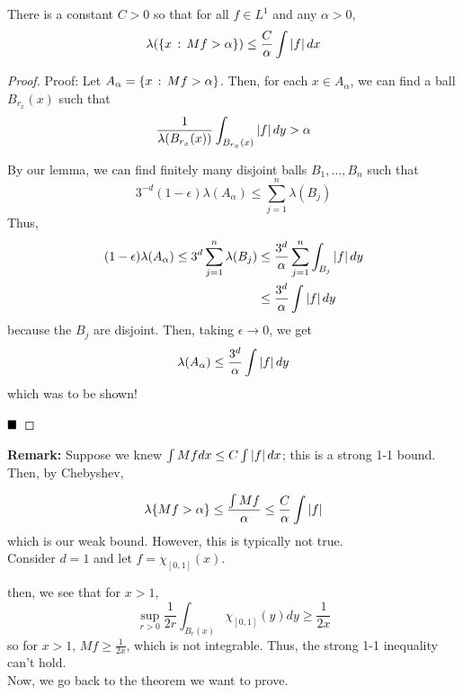 \begin{theorem}
    There is a constant $C > 0$ so that for all $f \in L^1$ and any $\alpha > 0$,
    \[ \lambda(\{x \, :\, Mf > \alpha\}) \leq \frac{C}{\alpha}\int \left\lvert {f} \right\rvert dx \]
\end{theorem}
\begin{proof}{Proof:}
    Let $A_{\alpha} = \{x \, :\, Mf > \alpha\}$. Then, for each $x \in A_{\alpha}$, we can find a ball $B_{r_x}(x)$ such that
    \[ \frac{1}{\lambda(B_{r_x}(x))} \int_{B_{r_x}(x)} \left\lvert {f} \right\rvert dy > \alpha \]

    By our lemma, we can find finitely many disjoint balls $B_1, \ldots, B_n$ such that
    \[ 3^{-d}(1 - \epsilon)\lambda(A_{\alpha}) \leq \sum_{j = 1}^{n} \lambda(B_j) \]
    Thus,
    \begin{align*}
        (1 - \epsilon)\lambda(A_{\alpha}) \leq 3^d\sum_{j = 1}^{n} \lambda(B_j) &\leq \frac{3^d}{\alpha}\sum_{j = 1}^{n} \int_{B_j} \left\lvert {f} \right\rvert dy\\
        &\leq \frac{3^d}{\alpha}\int \left\lvert {f} \right\rvert dy
    \end{align*}
    because the $B_j$ are disjoint. Then, taking $\epsilon \to 0$, we get
    \[ \lambda(A_{\alpha}) \leq \frac{3^d}{\alpha}\int \left\lvert {f} \right\rvert dy \]
    which was to be shown!

    $\qed$
\end{proof}

\textbf{Remark:} Suppose we knew $\int Mf dx \leq C\int \left\lvert {f} \right\rvert dx$; this is a strong 1-1 bound. Then, by Chebyshev,

\[ \lambda\{Mf > \alpha\} \leq \frac{\int Mf}{\alpha} \leq \frac{C}{\alpha}\int \left\lvert {f} \right\rvert \]
which is our weak bound. However, this is typically not true.\\

Consider $d = 1$ and let $f = \chi_{[0, 1]}(x)$.

then, we see that for $x > 1$,
\[ \sup_{r > 0} \frac{1}{2r}\int_{B_r(x)} \chi_{[0, 1]}(y) dy \geq \frac{1}{2x} \]
so for $x > 1$, $Mf \geq \frac{1}{2x}$, which is not integrable. Thus, the strong 1-1 inequality can't hold.\\

Now, we go back to the theorem we want to prove.
\vspace{0.2cm}

